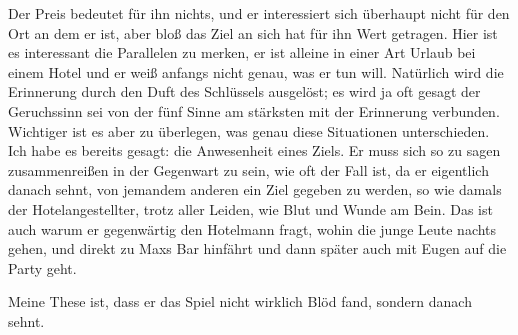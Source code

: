 \documentclass[12pt,a4paper]{article}
\begin{document}
\vspace{-.5em}
Der Preis bedeutet für ihn nichts, und er interessiert sich überhaupt nicht für den Ort an dem er ist, aber bloß das Ziel an sich hat für ihn Wert getragen. Hier ist es interessant die Parallelen zu merken, er ist alleine in einer Art Urlaub bei einem Hotel und er weiß anfangs nicht genau, was er tun will. Natürlich wird die Erinnerung durch den Duft des Schlüssels ausgelöst; es wird ja oft gesagt der Geruchssinn sei von der fünf Sinne am stärksten mit der Erinnerung verbunden. Wichtiger ist es aber zu überlegen, was genau diese Situationen unterschieden. Ich habe es bereits gesagt: die Anwesenheit eines Ziels. Er muss sich so zu sagen zusammenreißen in der Gegenwart zu sein, wie oft der Fall ist, da er eigentlich danach sehnt, von jemandem anderen ein Ziel gegeben zu werden, so wie damals der Hotelangestellter, trotz aller Leiden, wie Blut und Wunde am Bein. Das ist auch warum er gegenwärtig den Hotelmann fragt, wohin die junge Leute nachts gehen, und direkt zu Maxs Bar hinfährt und dann später auch mit Eugen auf die Party geht.\par
%
Meine These ist, dass er das Spiel nicht wirklich Blöd fand, sondern danach sehnt.
\end{document}
